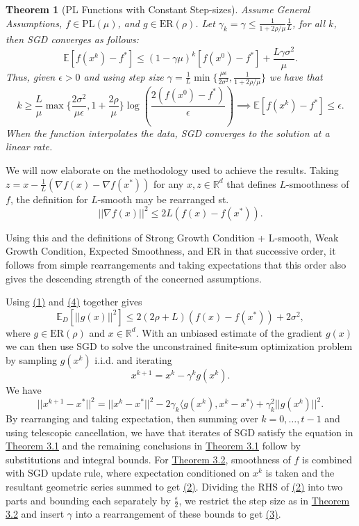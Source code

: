 \documentclass{article}
\newtheorem{theorem}{Theorem}[section]
\begin{document}
\begin{theorem}[PL Functions with Constant Step-sizes]
	\label{them32}
	Assume \textit{General Assumptions}, $f\in\text{PL}(\mu)$, and $g\in\text{ER}(\rho)$. Let $\gamma_k = \gamma\leq \frac{1}{1+2\rho/\mu}\frac{1}{L}$, for all $k$, then SGD converges as follows:
	\begin{equation}
		\label{eq32}
		\mathbb{E}[f(x^k) - f^*] \leq (1-\gamma\mu)^k[f(x^0) - f^*] + \frac{L\gamma\sigma^2}{\mu}.
	\end{equation}
	Thus, given $\epsilon > 0$ and using step size $\gamma = \frac{1}{L}\min\{\frac{\mu\epsilon}{2\sigma^2}, \frac{1}{1+2\rho/\mu}\}$ we have that
	\begin{equation}
		\label{eq33}
		k\geq \frac{L}{\mu}\max\{\frac{2\sigma^2}{\mu\epsilon}, 1+\frac{2\rho}{\mu}\}\log\left(\frac{2(f(x^0) - f^*)}{\epsilon}\right) \implies \mathbb{E}[f(x^k) - f^*]\leq \epsilon.
	\end{equation}
	When the function interpolates the data, SGD converges to the solution at a linear rate.
\end{theorem}

We will now elaborate on the methodology used to achieve the results. Taking $z=x-\frac{1}{L}(\nabla f(x) - \nabla f(x^*))$ for any $x,z\in\mathbb{R}^d$ that defines $L$-smoothness of $f$, the definition for $L$-smooth may be rearranged st.
\begin{equation}
	\label{eq34}
	||\nabla f(x)||^2 \leq 2L(f(x) - f(x^*)).
\end{equation}

Using this and the definitions of Strong Growth Condition + L-smooth, Weak Growth Condition, Expected Smoothness, and ER in that successive order, it follows from simple rearrangements and taking expectations that this order also gives the descending strength of the concerned assumptions.

Using \hyperref[eq31]{(1)} and \hyperref[eq34]{(4)} together gives
\begin{equation}
	\mathbb{E}_D\left[||g(x)||^2\right]\leq 2(2\rho + L)(f(x) - f(x^*)) + 2\sigma^2,
\end{equation}
where $g\in\text{ER}(\rho)$ and $x\in\mathbb{R}^d$. With an unbiased estimate of the gradient $g(x)$ we can then use SGD to solve the unconstrained finite-sum optimization problem by sampling $g(x^k)$ i.i.d. and iterating
\[x^{k+1} = x^k - \gamma^k g(x^k).
\]
We have
\[||x^{k+1} - x^*||^2 = ||x^k - x^*||^2 - 2\gamma_k \langle g(x^k), x^k - x^*\rangle + \gamma_k^2 ||g(x^k)||^2.
\]
By rearranging and taking expectation, then summing over $k=0, \dots, t-1$ and using telescopic cancellation, we have that iterates of SGD satisfy the equation in \hyperref[them31]{Theorem 3.1} and the remaining conclusions in \hyperref[them31]{Theorem 3.1} follow by substitutions and integral bounds.
For \hyperref[them32]{Theorem 3.2}, smoothness of $f$ is combined with SGD update rule, where expectation conditioned on $x^k$ is taken and the resultant geometric series summed to get \hyperref[eq32]{(2)}. Dividing the RHS of \hyperref[eq32]{(2)} into two parts and bounding each separately by $\frac{\epsilon}{2}$, we restrict
the step size as in \hyperref[them32]{Theorem 3.2} and insert $\gamma$ into a rearrangement of these bounds to get \hyperref[eq33]{(3)}.
\end{document}
